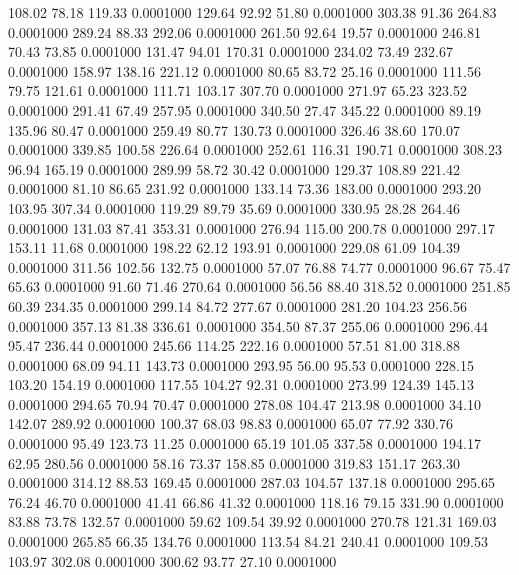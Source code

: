  108.02   78.18  119.33   0.0001000
 129.64   92.92   51.80   0.0001000
 303.38   91.36  264.83   0.0001000
 289.24   88.33  292.06   0.0001000
 261.50   92.64   19.57   0.0001000
 246.81   70.43   73.85   0.0001000
 131.47   94.01  170.31   0.0001000
 234.02   73.49  232.67   0.0001000
 158.97  138.16  221.12   0.0001000
  80.65   83.72   25.16   0.0001000
 111.56   79.75  121.61   0.0001000
 111.71  103.17  307.70   0.0001000
 271.97   65.23  323.52   0.0001000
 291.41   67.49  257.95   0.0001000
 340.50   27.47  345.22   0.0001000
  89.19  135.96   80.47   0.0001000
 259.49   80.77  130.73   0.0001000
 326.46   38.60  170.07   0.0001000
 339.85  100.58  226.64   0.0001000
 252.61  116.31  190.71   0.0001000
 308.23   96.94  165.19   0.0001000
 289.99   58.72   30.42   0.0001000
 129.37  108.89  221.42   0.0001000
  81.10   86.65  231.92   0.0001000
 133.14   73.36  183.00   0.0001000
 293.20  103.95  307.34   0.0001000
 119.29   89.79   35.69   0.0001000
 330.95   28.28  264.46   0.0001000
 131.03   87.41  353.31   0.0001000
 276.94  115.00  200.78   0.0001000
 297.17  153.11   11.68   0.0001000
 198.22   62.12  193.91   0.0001000
 229.08   61.09  104.39   0.0001000
 311.56  102.56  132.75   0.0001000
  57.07   76.88   74.77   0.0001000
  96.67   75.47   65.63   0.0001000
  91.60   71.46  270.64   0.0001000
  56.56   88.40  318.52   0.0001000
 251.85   60.39  234.35   0.0001000
 299.14   84.72  277.67   0.0001000
 281.20  104.23  256.56   0.0001000
 357.13   81.38  336.61   0.0001000
 354.50   87.37  255.06   0.0001000
 296.44   95.47  236.44   0.0001000
 245.66  114.25  222.16   0.0001000
  57.51   81.00  318.88   0.0001000
  68.09   94.11  143.73   0.0001000
 293.95   56.00   95.53   0.0001000
 228.15  103.20  154.19   0.0001000
 117.55  104.27   92.31   0.0001000
 273.99  124.39  145.13   0.0001000
 294.65   70.94   70.47   0.0001000
 278.08  104.47  213.98   0.0001000
  34.10  142.07  289.92   0.0001000
 100.37   68.03   98.83   0.0001000
  65.07   77.92  330.76   0.0001000
  95.49  123.73   11.25   0.0001000
  65.19  101.05  337.58   0.0001000
 194.17   62.95  280.56   0.0001000
  58.16   73.37  158.85   0.0001000
 319.83  151.17  263.30   0.0001000
 314.12   88.53  169.45   0.0001000
 287.03  104.57  137.18   0.0001000
 295.65   76.24   46.70   0.0001000
  41.41   66.86   41.32   0.0001000
 118.16   79.15  331.90   0.0001000
  83.88   73.78  132.57   0.0001000
  59.62  109.54   39.92   0.0001000
 270.78  121.31  169.03   0.0001000
 265.85   66.35  134.76   0.0001000
 113.54   84.21  240.41   0.0001000
 109.53  103.97  302.08   0.0001000
 300.62   93.77   27.10   0.0001000

